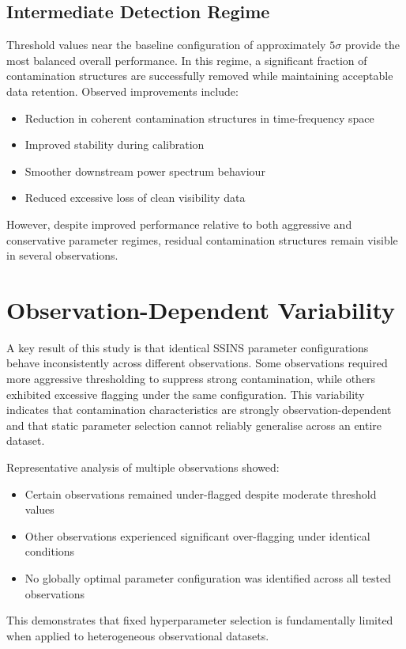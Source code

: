 \documentclass{article}
\begin{document}
\subsection{Intermediate Detection Regime}
Threshold values near the baseline configuration of approximately $5\sigma$ provide the most balanced overall performance. In this regime, a significant fraction of contamination structures are successfully removed while maintaining acceptable data retention. Observed improvements include:
\begin{itemize}
\item Reduction in coherent contamination structures in time-frequency space
\item Improved stability during calibration
\item Smoother downstream power spectrum behaviour
\item Reduced excessive loss of clean visibility data
\end{itemize}
However, despite improved performance relative to both aggressive and conservative parameter regimes, residual contamination structures remain visible in several observations.

\section{Observation-Dependent Variability}
A key result of this study is that identical SSINS parameter configurations behave inconsistently across different observations. Some observations required more aggressive thresholding to suppress strong contamination, while others exhibited excessive flagging under the same configuration. This variability indicates that contamination characteristics are strongly observation-dependent and that static parameter selection cannot reliably generalise across an entire dataset.

Representative analysis of multiple observations showed:
\begin{itemize}
\item Certain observations remained under-flagged despite moderate threshold values
\item Other observations experienced significant over-flagging under identical conditions
\item No globally optimal parameter configuration was identified across all tested observations
\end{itemize}
This demonstrates that fixed hyperparameter selection is fundamentally limited when applied to heterogeneous observational datasets.
\end{document}
